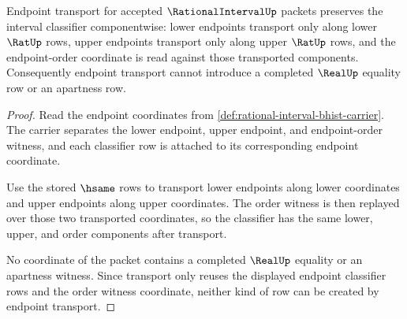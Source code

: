 \begin{theorem}
\label{thm:rational-interval-endpoint-transport-classifier}
Endpoint transport for accepted $\RationalIntervalUp$ packets preserves the
interval classifier componentwise: lower endpoints transport only along lower
$\RatUp$ rows, upper endpoints transport only along upper $\RatUp$ rows, and
the endpoint-order coordinate is read against those transported components.
Consequently endpoint transport cannot introduce a completed $\RealUp$
equality row or an apartness row.
\end{theorem}
\begin{proof}
Read the endpoint coordinates from
\autoref{def:rational-interval-bhist-carrier}. The carrier separates the lower
endpoint, upper endpoint, and endpoint-order witness, and each classifier row
is attached to its corresponding endpoint coordinate.

Use the stored $\hsame$ rows to transport lower endpoints along lower
coordinates and upper endpoints along upper coordinates. The order witness is
then replayed over those two transported coordinates, so the classifier has
the same lower, upper, and order components after transport.

No coordinate of the packet contains a completed $\RealUp$ equality or an
apartness witness. Since transport only reuses the displayed endpoint
classifier rows and the order witness coordinate, neither kind of row can be
created by endpoint transport.
\end{proof}

